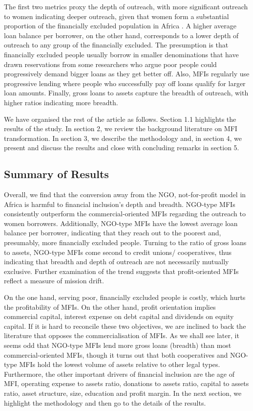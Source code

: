 \documentclass[a4paper,nobind]{templates/ociamthesis}
\begin{document}
The first two metrics proxy the depth of outreach, with more significant outreach to women indicating deeper outreach, given that women form a substantial proportion of the financially excluded population in Africa \autocite{ayyagari2013financing}. A higher average loan balance per borrower, on the other hand, corresponds to a lower depth of outreach to any group of the financially excluded. The presumption is that financially excluded people usually borrow in smaller denominations that have drawn reservations from some researchers who argue poor people could progressively demand bigger loans as they get better off. Also, MFIs regularly use progressive lending where people who successfully pay off loans qualify for larger loan amounts. Finally, gross loans to assets capture the breadth of outreach, with higher ratios indicating more breadth.

We have organised the rest of the article as follows. Section 1.1 highlights the results of the study. In section 2, we review the background literature on MFI transformation. In section 3, we describe the methodology and, in section 4, we present and discuss the results and close with concluding remarks in section 5.

\hypertarget{summary-of-results}{%
\subsection{\texorpdfstring{\textbf{Summary of Results}}{Summary of Results}}\label{summary-of-results}}

Overall, we find that the conversion away from the NGO, not-for-profit model in Africa is harmful to financial inclusion's depth and breadth. NGO-type MFIs consistently outperform the commercial-oriented MFIs regarding the outreach to women borrowers. Additionally, NGO-type MFIs have the lowest average loan balance per borrower, indicating that they reach out to the poorest and, presumably, more financially excluded people. Turning to the ratio of gross loans to assets, NGO-type MFIs come second to credit unions/ cooperatives, thus indicating that breadth and depth of outreach are not necessarily mutually exclusive. Further examination of the trend suggests that profit-oriented MFIs reflect a measure of mission drift.

On the one hand, serving poor, financially excluded people is costly, which hurts the profitability of MFIs. On the other hand, profit orientation implies commercial capital, interest expense on debt capital and dividends on equity capital. If it is hard to reconcile these two objectives, we are inclined to back the literature that opposes the commercialisation of MFIs. As we shall see later, it seems odd that NGO-type MFIs lend more gross loans (breadth) than most commercial-oriented MFIs, though it turns out that both cooperatives and NGO-type MFIs hold the lowest volume of assets relative to other legal types. Furthermore, the other important drivers of financial inclusion are the age of MFI, operating expense to assets ratio, donations to assets ratio, capital to assets ratio, asset structure, size, education and profit margin. In the next section, we highlight the methodology and then go to the details of the results.
\end{document}
